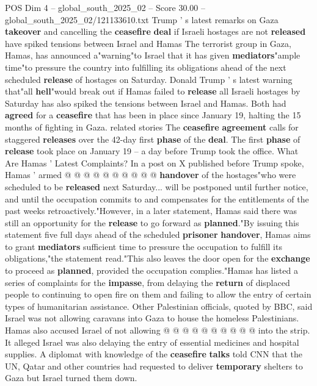 \begin{textsample}{POS Dim 4 – global\_south\_2025\_02 – Score 30.00 – global\_south\_2025\_02/121133610.txt}  \label{ex:f4_pos_022}
Trump ' s latest remarks on Gaza \textbf{takeover} and cancelling the \textbf{ceasefire} \textbf{deal} if Israeli hostages are not \textbf{released} have spiked tensions between Israel and Hamas The terrorist group in Gaza, Hamas, has announced a"warning"to Israel that it has given \textbf{mediators}"ample time"to pressure the country into fulfilling its obligations ahead of the next scheduled \textbf{release} of hostages on Saturday.
Donald Trump ' s latest warning that"all \textbf{hell}"would break out if Hamas failed to \textbf{release} all Israeli hostages by Saturday has also spiked the tensions between Israel and Hamas.
Both had \textbf{agreed} for a \textbf{ceasefire} that has been in place since January 19, halting the 15 months of fighting in Gaza. related stories The \textbf{ceasefire} \textbf{agreement} calls for staggered \textbf{releases} over the 42-day first \textbf{phase} of the \textbf{deal}.
The first \textbf{phase} of \textbf{release} took place on January 19 -- a day before Trump took the office.
What Are Hamas ' Latest Complaints?
In a post on X published before Trump spoke, Hamas ' armed @ @ @ @ @ @ @ @ @ @ \textbf{handover} of the hostages"who were scheduled to be \textbf{released} next Saturday... will be postponed until further notice, and until the occupation commits to and compensates for the entitlements of the past weeks retroactively."However, in a later statement, Hamas said there was still an opportunity for the \textbf{release} to go forward as \textbf{planned}."By issuing this statement five full days ahead of the scheduled \textbf{prisoner} \textbf{handover}, Hamas aims to grant \textbf{mediators} sufficient time to pressure the occupation to fulfill its obligations,"the statement read."This also leaves the door open for the \textbf{exchange} to proceed as \textbf{planned}, provided the occupation complies."Hamas has listed a series of complaints for the \textbf{impasse}, from delaying the \textbf{return} of displaced people to continuing to open fire on them and failing to allow the entry of certain types of humanitarian assistance.
Other Palestinian officials, quoted by BBC, said Israel was not allowing caravans into Gaza to house the homeless Palestinians.
Hamas also accused Israel of not allowing @ @ @ @ @ @ @ @ @ @ into the strip.
It alleged Israel was also delaying the entry of essential medicines and hospital supplies.
A diplomat with knowledge of the \textbf{ceasefire} \textbf{talks} told CNN that the UN, Qatar and other countries had requested to deliver \textbf{temporary} shelters to Gaza but Israel turned them down.

\end{textsample}
